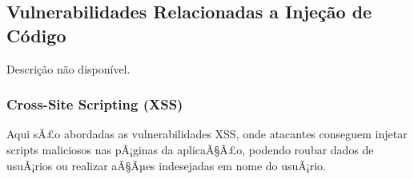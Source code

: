 \documentclass[a4paper,12pt]{article}
\begin{document}
\subsection{Vulnerabilidades Relacionadas a Injeção de Código}
Descrição não disponível.

\subsubsection{Cross-Site Scripting (XSS)}
Aqui sÃ£o abordadas as vulnerabilidades XSS, onde atacantes conseguem injetar scripts maliciosos nas pÃ¡ginas da aplicaÃ§Ã£o, podendo roubar dados de usuÃ¡rios ou realizar aÃ§Ãµes indesejadas em nome do usuÃ¡rio.
\end{document}
